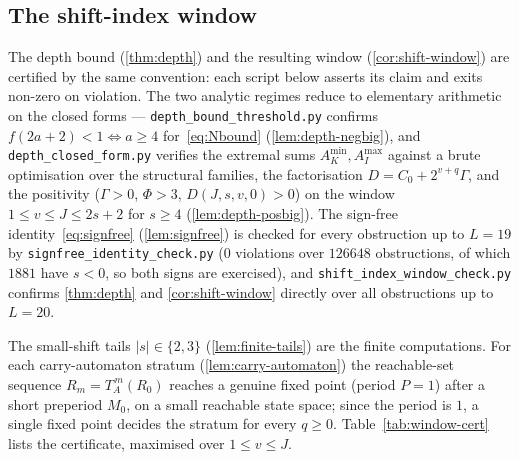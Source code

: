 \documentclass[11pt,reqno]{amsart}
\begin{document}
\subsection{The shift-index window}
\label{sec:appendix-window}

The depth bound (\cref{thm:depth}) and the resulting window
(\cref{cor:shift-window}) are certified by the same convention: each script
below asserts its claim and exits non-zero on violation. The two analytic
regimes reduce to elementary arithmetic on the closed forms ---
\texttt{depth\_bound\_threshold.py} confirms $f(2a+2) < 1 \iff a \ge 4$
for~\eqref{eq:Nbound} (\cref{lem:depth-negbig}), and
\texttt{depth\_closed\_form.py} verifies the extremal sums $A_K^{\min}, A_I^{\max}$
against a brute optimisation over the structural families, the factorisation
$D = C_0 + 2^{v+q}\Gamma$, and the positivity ($\Gamma > 0$, $\Phi > 3$,
$D(J,s,v,0) > 0$) on the window $1 \le v \le J \le 2s+2$ for $s \ge 4$
(\cref{lem:depth-posbig}). The sign-free identity~\eqref{eq:signfree}
(\cref{lem:signfree}) is checked for every obstruction up to $L = 19$ by
\texttt{signfree\_identity\_check.py} ($0$ violations over $126648$ obstructions,
of which $1881$ have $s < 0$, so both signs are exercised), and
\texttt{shift\_index\_window\_check.py} confirms \cref{thm:depth} and
\cref{cor:shift-window} directly over all obstructions up to $L = 20$.

The small-shift tails $|s| \in \{2,3\}$ (\cref{lem:finite-tails}) are the finite
computations. For each carry-automaton stratum (\cref{lem:carry-automaton}) the
reachable-set sequence $R_m = T_A^{\,m}(R_0)$ reaches a genuine fixed point
(period $P = 1$) after a short preperiod $M_0$, on a small reachable state space;
since the period is $1$, a single fixed point decides the stratum for every
$q \ge 0$. Table~\ref{tab:window-cert} lists the certificate, maximised over
$1 \le v \le J$.
\end{document}

